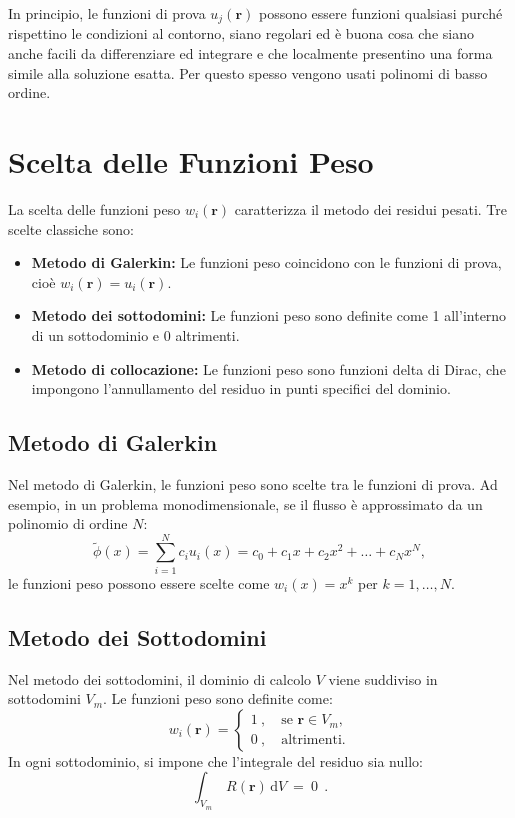 	In principio, le funzioni di prova $u_j(\mathbf r)$ possono essere funzioni qualsiasi purché rispettino le condizioni al contorno, siano regolari ed è buona cosa che siano anche facili da differenziare ed integrare e che localmente presentino una forma simile alla soluzione esatta. Per questo spesso vengono usati polinomi di basso ordine.
	
%
%
%	
\section{Scelta delle Funzioni Peso}
	La scelta delle funzioni peso \(w_i(\mathbf{r})\) caratterizza il metodo dei residui pesati. Tre scelte classiche sono:
	\begin{itemize}
		\item \textbf{Metodo di Galerkin:} Le funzioni peso coincidono con le funzioni di prova, cioè \(w_i(\mathbf{r}) = u_i(\mathbf{r})\).
		\item \textbf{Metodo dei sottodomini:} Le funzioni peso sono definite come 1 all'interno di un sottodominio e 0 altrimenti.
		\item \textbf{Metodo di collocazione:} Le funzioni peso sono funzioni delta di Dirac, che impongono l'annullamento del residuo in punti specifici del dominio.
	\end{itemize}
	
\subsection{Metodo di Galerkin}
	Nel metodo di Galerkin, le funzioni peso sono scelte tra le funzioni di prova. Ad esempio, in un problema monodimensionale, se il flusso è approssimato da un polinomio di ordine \(N\):
	\[
	\tilde{\phi}(x) = \sum_{i=1}^N c_i u_i(x) = c_0 + c_1 x + c_2 x^2 + \dots + c_N x^N,
	\]
	le funzioni peso possono essere scelte come \(w_i(x) = x^k\) per \(k = 1, \dots, N\).
	
\subsection{Metodo dei Sottodomini}
	Nel metodo dei sottodomini, il dominio di calcolo \(V\) viene suddiviso in sottodomini \(V_m\). Le funzioni peso sono definite come:
	\[
	w_i(\mathbf{r}) = \begin{cases}
		1\ , \quad \text{se } \mathbf{r} \in V_m, \\
		0\ , \quad \text{altrimenti}.
	\end{cases}
	\]
	In ogni sottodominio, si impone che l'integrale del residuo sia nullo:
	\[
	\int_{V_m}\, R(\mathbf{r}) \, \mathrm{d}V\ =\ 0\ \ .
	\]
